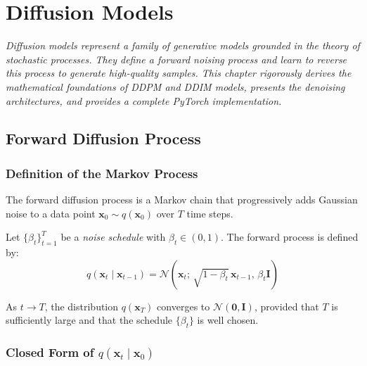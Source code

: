 \chapter{Diffusion Models}
\label{ch:diffusion}

\noindent\textit{Diffusion models represent a family of generative models grounded in the
theory of stochastic processes. They define a forward noising process and
learn to reverse this process to generate high-quality samples. This chapter
rigorously derives the mathematical foundations of DDPM and DDIM models,
presents the denoising architectures, and provides a complete PyTorch
implementation.}\medskip

\section{Forward Diffusion Process}
\label{sec:diffusion-forward}

\subsection{Definition of the Markov Process}

The forward diffusion process is a Markov chain that progressively adds
Gaussian noise to a data point $\mathbf{x}_0 \sim q(\mathbf{x}_0)$
over $T$ time steps.

\begin{definition}
\label{def:forward-diffusion}
Let $\{\beta_t\}_{t=1}^{T}$ be a \emph{noise schedule}
with $\beta_t \in (0, 1)$. The forward process is defined by:
\begin{equation}
q(\mathbf{x}_t \mid \mathbf{x}_{t-1}) = \mathcal{N}\!\left(\mathbf{x}_t;\, \sqrt{1 - \beta_t}\,\mathbf{x}_{t-1},\, \beta_t \mathbf{I}\right)
\label{eq:forward-step}
\end{equation}
\end{definition}

\begin{remark}
As $t \to T$, the distribution $q(\mathbf{x}_T)$ converges to
$\mathcal{N}(\mathbf{0}, \mathbf{I})$, provided that $T$ is sufficiently large
and that the schedule $\{\beta_t\}$ is well chosen.
\end{remark}

\subsection{Closed Form of $q(\mathbf{x}_t \mid \mathbf{x}_0)$}
\label{sec:closed-form}

